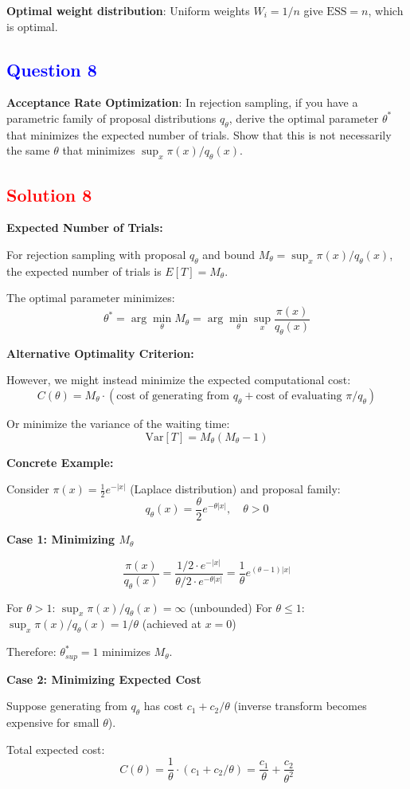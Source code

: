 \documentclass[11pt]{article}
\newcommand{\question}[1]{\subsection*{\textcolor{blue}{Question #1}}}
\newcommand{\solution}[1]{\subsection*{\textcolor{red}{Solution #1}}}
\begin{document}
\textbf{Optimal weight distribution}: 
Uniform weights $W_i = 1/n$ give $\text{ESS} = n$, which is optimal.

\question{8}
\textbf{Acceptance Rate Optimization}: In rejection sampling, if you have a parametric family of proposal distributions $q_\theta$, derive the optimal parameter $\theta^*$ that minimizes the expected number of trials. Show that this is not necessarily the same $\theta$ that minimizes $\sup_x \pi(x)/q_\theta(x)$.

\solution{8}
\textbf{Expected Number of Trials:}

For rejection sampling with proposal $q_\theta$ and bound $M_\theta = \sup_x \pi(x)/q_\theta(x)$, the expected number of trials is $E[T] = M_\theta$.

The optimal parameter minimizes:
$$\theta^* = \arg\min_\theta M_\theta = \arg\min_\theta \sup_x \frac{\pi(x)}{q_\theta(x)}$$

\textbf{Alternative Optimality Criterion:}

However, we might instead minimize the expected computational cost:
$$C(\theta) = M_\theta \cdot (\text{cost of generating from } q_\theta + \text{cost of evaluating } \pi/q_\theta)$$

Or minimize the variance of the waiting time:
$$\text{Var}[T] = M_\theta(M_\theta - 1)$$

\textbf{Concrete Example:}

Consider $\pi(x) = \frac{1}{2}e^{-|x|}$ (Laplace distribution) and proposal family:
$$q_\theta(x) = \frac{\theta}{2}e^{-\theta|x|}, \quad \theta > 0$$

\textbf{Case 1: Minimizing $M_\theta$}

$$\frac{\pi(x)}{q_\theta(x)} = \frac{1/2 \cdot e^{-|x|}}{\theta/2 \cdot e^{-\theta|x|}} = \frac{1}{\theta}e^{(\theta-1)|x|}$$

For $\theta > 1$: $\sup_x \pi(x)/q_\theta(x) = \infty$ (unbounded)
For $\theta \leq 1$: $\sup_x \pi(x)/q_\theta(x) = 1/\theta$ (achieved at $x = 0$)

Therefore: $\theta^*_{sup} = 1$ minimizes $M_\theta$.

\textbf{Case 2: Minimizing Expected Cost}

Suppose generating from $q_\theta$ has cost $c_1 + c_2/\theta$ (inverse transform becomes expensive for small $\theta$).

Total expected cost:
$$C(\theta) = \frac{1}{\theta} \cdot (c_1 + c_2/\theta) = \frac{c_1}{\theta} + \frac{c_2}{\theta^2}$$
\end{document}
